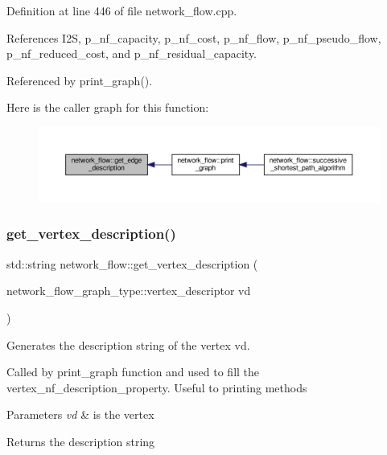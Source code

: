 Definition at line 446 of file network\+\_\+flow.\+cpp.



References I2S, p\+\_\+nf\+\_\+capacity, p\+\_\+nf\+\_\+cost, p\+\_\+nf\+\_\+flow, p\+\_\+nf\+\_\+pseudo\+\_\+flow, p\+\_\+nf\+\_\+reduced\+\_\+cost, and p\+\_\+nf\+\_\+residual\+\_\+capacity.



Referenced by print\+\_\+graph().

Here is the caller graph for this function\+:
\nopagebreak
\begin{figure}[H]
\begin{center}
\leavevmode
\includegraphics[width=350pt]{d2/d4f/classnetwork__flow_aa2eff0f34c5f856ec9541fcc967dccce_icgraph}
\end{center}
\end{figure}
\mbox{\label{classnetwork__flow_aab892c67c8c4cc7049425026abb761d3}} 
\subsubsection{\texorpdfstring{get\+\_\+vertex\+\_\+description()}{get\_vertex\_description()}}
{\footnotesize\ttfamily std\+::string network\+\_\+flow\+::get\+\_\+vertex\+\_\+description (\begin{DoxyParamCaption}\item[{network\+\_\+flow\+\_\+graph\+\_\+type\+::vertex\+\_\+descriptor}]{vd }\end{DoxyParamCaption})\hspace{0.3cm}{\ttfamily [private]}}



Generates the description string of the vertex vd. 

Called by print\+\_\+graph function and used to fill the vertex\+\_\+nf\+\_\+description\+\_\+property. Useful to printing methods 
\begin{DoxyParams}{Parameters}
{\em vd} & is the vertex \\
\hline
\end{DoxyParams}
\begin{DoxyReturn}{Returns}
the description string 
\end{DoxyReturn}


